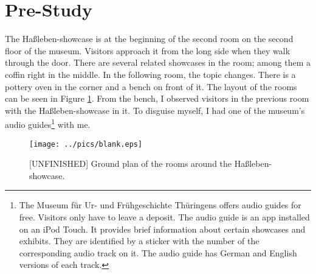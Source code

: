 
\section{Pre-Study}
\label{evaluation_pre}

The Haßleben-showcase is at the beginning of the second room on the second floor of the museum. Visitors approach it from the long side when they walk through the door. There are several related showcases in the room; among them a coffin right in the middle. In the following room, the topic changes. There is a pottery oven in the corner and a bench on front of it. The layout of the rooms can be seen in Figure \ref{fig:hassleben_pottery_layout}. From the bench, I observed visitors in the previous room with the Haßleben-showcase in it. To disguise myself, I had one of the museum's audio guides\footnote{The Museum für Ur- und Frühgeschichte Thüringens offers audio guides for free. Visitors only have to leave a deposit. The audio guide is an app installed on an iPod Touch. It provides brief information about certain showcases and exhibits. They are identified by a sticker with the number of the corresponding audio track on it. The audio guide has German and English versions of each track.} with me.  
\begin{figure}[H]%
\texttt{[image: ../pics/blank.eps]}%
\caption{[UNFINISHED] Ground plan of the rooms around the Haßleben-showcase.}
\label{fig:hassleben_pottery_layout} %
\end{figure}
 

